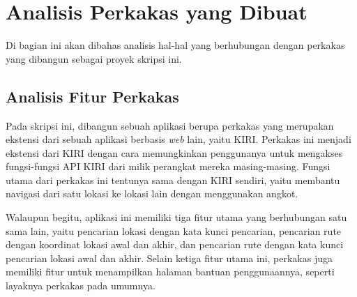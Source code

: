 \section{Analisis Perkakas yang Dibuat}
\label{sec:analysis-thesisapp}

Di bagian ini akan dibahas analisis hal-hal yang berhubungan dengan perkakas yang dibangun sebagai proyek skripsi ini.

\subsection{Analisis Fitur Perkakas}
\label{sec:analysis-thesisapp-features}

Pada skripsi ini, dibangun sebuah aplikasi berupa perkakas \cl\xspace yang merupakan ekstensi dari sebuah aplikasi berbasis \textit{web} lain, yaitu KIRI. Perkakas ini menjadi ekstensi dari KIRI dengan cara memungkinkan penggunanya untuk mengakses fungsi-fungsi API KIRI dari \cl\xspace milik perangkat mereka masing-masing. Fungsi utama dari perkakas ini tentunya sama dengan KIRI sendiri, yaitu membantu navigasi dari satu lokasi ke lokasi lain dengan menggunakan angkot.

Walaupun begitu, aplikasi ini memiliki tiga fitur utama yang berhubungan satu sama lain, yaitu pencarian lokasi dengan kata kunci pencarian, pencarian rute dengan koordinat \latlon\xspace lokasi awal dan akhir, dan pencarian rute dengan kata kunci pencarian lokasi awal dan akhir. Selain ketiga fitur utama ini, perkakas juga memiliki fitur untuk menampilkan halaman bantuan penggunaannya, seperti layaknya perkakas \cl\xspace pada umumnya.

